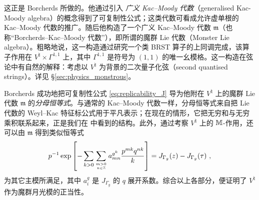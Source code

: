 

这正是 Borcherds 所做的。他通过引入 \emph{广义 Kac–Moody 代数}（generalised Kac-Moody algebra）的概念得到了可复制性公式；这类代数可看成允许虚单根的 Kac–Moody 代数的推广。随后他构造了一个广义 Kac–Moody 代数 $\mathfrak{m}$（也称“Borcherds–Kac–Moody 代数”），即所谓的魔群 Lie 代数（Monster Lie algebra）。粗略地说，这一构造通过研究一个类 BRST 算子的上同调完成，该算子作用在 $V^\natural\times\Gamma^{1,1}$ 上，其中 $\Gamma^{1,1}$ 是符号为 $(1,1)$ 的唯一幺模格。这一构造在弦论中有自然的解释：考虑以 $V^\natural$ 为背景的二次量子化弦（second quantised strings）。详见 \S\ref{sec:physics_monstrous}。



Borcherds 成功地把可复制性公式 \eqref{eq:replicability_J} 导为他附在 $V^\natural$ 上的魔群 Lie 代数 $\mathfrak{m}$ 的\emph{分母恒等式}。与通常的 Kac–Moody 代数一样，分母恒等式来自把 Lie 代数的 Weyl–Kac 特征标公式用于平凡表示；在现在的情形，它把无穷和与无穷乘积联系起来，正是我们在  中看到的结构。此外，通过考察 $V^\natural$ 上的 $\mathbb{M}$-作用，还可以由 $\mathfrak{m}$ 得到类似恒等式
\begin{equation}
\label{eq:replicability_T}
p^{-1}\exp\left[-\sum_{k>0}\sum_{m>0\atop n\in\mathbb{Z}} a_{mn}^{g^k}\frac{p^{mk}q^{nk}}{k}\right]=J_{\Gamma_g}(z)-J_{\Gamma_g}(\tau)~,
\end{equation}
为其它主模所满足，其中 $a_i^g$ 是 $J_{\Gamma_g}$ 的 $q$ 展开系数。综合以上各部分，便证明了 $V^\natural$ 作为魔群月光模的正当性。

